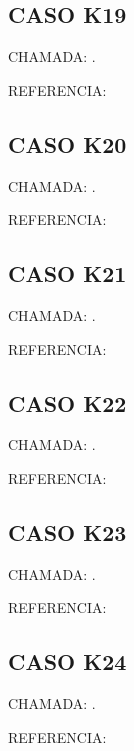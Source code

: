 \documentclass{undftex}
\begin{document}
\begin{refsection}\section*{CASO K19} CHAMADA: . \textcite{k19}\par REFERENCIA:\par\printbibliography[heading=none,check=undfconsultadas]\end{refsection}\clearpage
\begin{refsection}\section*{CASO K20} CHAMADA: . \textcite{k20}\par REFERENCIA:\par\printbibliography[heading=none,check=undfconsultadas]\end{refsection}\clearpage
\begin{refsection}\section*{CASO K21} CHAMADA: . \textcite{k21}\par REFERENCIA:\par\printbibliography[heading=none,check=undfconsultadas]\end{refsection}\clearpage
\begin{refsection}\section*{CASO K22} CHAMADA: . \textcite{k22}\par REFERENCIA:\par\printbibliography[heading=none,check=undfconsultadas]\end{refsection}\clearpage
\begin{refsection}\section*{CASO K23} CHAMADA: . \textcite{k23}\par REFERENCIA:\par\printbibliography[heading=none,check=undfconsultadas]\end{refsection}\clearpage
\begin{refsection}\section*{CASO K24} CHAMADA: . \textcite{k24}\par REFERENCIA:\par\printbibliography[heading=none,check=undfconsultadas]\end{refsection}\clearpage
\end{document}
